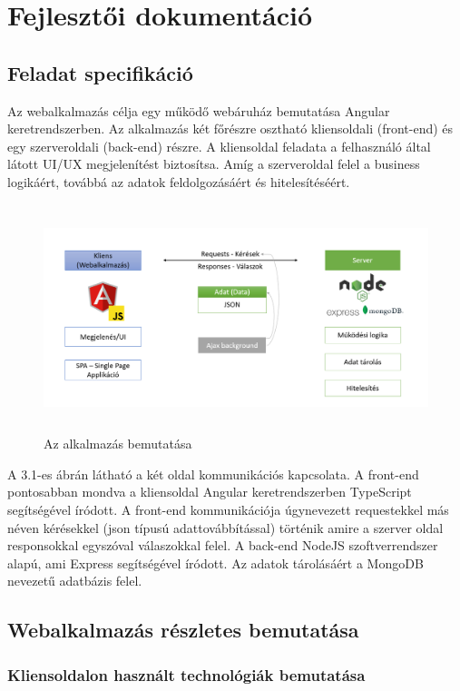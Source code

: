 \chapter{Fejlesztői dokumentáció} %
\label{ch:impl}

\section{Feladat specifikáció}
Az webalkalmazás célja egy működő webáruház bemutatása Angular keretrendszerben. Az alkalmazás két főrészre osztható kliensoldali (front-end) és egy szerveroldali (back-end) részre. A kliensoldal feladata a felhasználó által látott UI/UX megjelenítést biztosítsa. Amíg a szerveroldal felel a business logikáért, továbbá az adatok feldolgozásáért és hitelesítéséért.

\begin{figure}[H]
	\centering
	\includegraphics[width=1.0\textwidth,height=250px]{images/alkalmazas_bemutatasa.png}
	\caption{Az alkalmazás bemutatása}
	\label{fig.picture-1}
\end{figure}

A 3.1-es ábrán látható a két oldal kommunikációs kapcsolata. A front-end pontosabban mondva a kliensoldal Angular keretrendszerben TypeScript segítségével íródott. A front-end kommunikációja úgynevezett requestekkel más néven kérésekkel (json típusú adattovábbítással) történik amire a szerver oldal responsokkal egyszóval válaszokkal felel. A back-end NodeJS szoftverrendszer alapú, ami Express segítségével íródott. Az adatok tárolásáért a MongoDB nevezetű adatbázis felel.

\section{Webalkalmazás részletes bemutatása}

\subsection{Kliensoldalon használt technológiák bemutatása}

